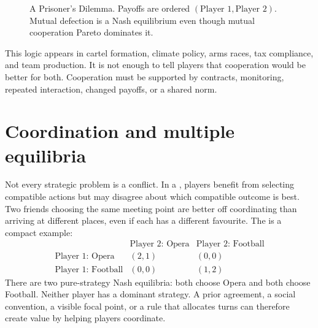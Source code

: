 \begin{figure}[htbp]
  \centering
  \caption{A Prisoner's Dilemma. Payoffs are ordered
  \((\text{Player 1},\text{Player 2})\). Mutual defection is a Nash
  equilibrium even though mutual cooperation Pareto dominates it.}
  \label{fig:prisoners-dilemma}
\end{figure}
\FloatBarrier

This logic appears in cartel formation, climate policy, arms races, tax
compliance, and team production. It is not enough to tell players that
cooperation would be better for both. Cooperation must be supported by
contracts, monitoring, repeated interaction, changed payoffs, or a shared norm.

\section{Coordination and multiple equilibria}

Not every strategic problem is a conflict. In a ,
players benefit from selecting compatible actions but may disagree about which
compatible outcome is best. Two friends choosing the same meeting point are
better off coordinating than arriving at different places, even if each has a
different favourite. The  is a compact example:
\[
\begin{array}{c|cc}
 & \text{Player 2: Opera} & \text{Player 2: Football}\\
\hline
\text{Player 1: Opera} & (2,1) & (0,0)\\
\text{Player 1: Football} & (0,0) & (1,2)
\end{array}
\]
There are two pure-strategy Nash equilibria: both choose Opera and both choose
Football. Neither player has a dominant strategy. A prior agreement, a social
convention, a visible focal point, or a rule that allocates turns can therefore
create value by helping players coordinate.

